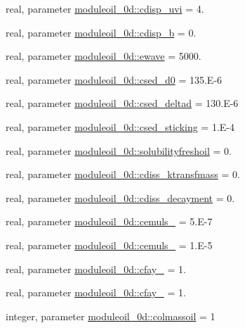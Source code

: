 \begin{DoxyCompactItemize}
\item 
real, parameter \mbox{\hyperlink{namespacemoduleoil__0d_a2ffff41b9d63e745753555b0be9d11be}{moduleoil\+\_\+0d\+::cdisp\+\_\+uvi}} = 4.
\item 
real, parameter \mbox{\hyperlink{namespacemoduleoil__0d_aa093e8de7aa1551ad61da7016758c1cf}{moduleoil\+\_\+0d\+::cdisp\+\_\+b}} = 0.
\item 
real, parameter \mbox{\hyperlink{namespacemoduleoil__0d_a35671174ac62a58afd6e806218d5dada}{moduleoil\+\_\+0d\+::ewave}} = 5000.
\item 
real, parameter \mbox{\hyperlink{namespacemoduleoil__0d_a57eeca412e82f0e98144ff9a97df5c74}{moduleoil\+\_\+0d\+::csed\+\_\+d0}} = 135.\+E-\/6
\item 
real, parameter \mbox{\hyperlink{namespacemoduleoil__0d_a1b21708096f1e93fbd65c07f072fda0f}{moduleoil\+\_\+0d\+::csed\+\_\+deltad}} = 130.\+E-\/6
\item 
real, parameter \mbox{\hyperlink{namespacemoduleoil__0d_aece02e045692a0b555549d5264b8354e}{moduleoil\+\_\+0d\+::csed\+\_\+sticking}} = 1.\+E-\/4
\item 
real, parameter \mbox{\hyperlink{namespacemoduleoil__0d_ab5235c8e862a94b78772c20b7a00d3b3}{moduleoil\+\_\+0d\+::solubilityfreshoil}} = 0.
\item 
real, parameter \mbox{\hyperlink{namespacemoduleoil__0d_a185606fb84723e999c8e1cfca9fe1671}{moduleoil\+\_\+0d\+::cdiss\+\_\+ktransfmass}} = 0.
\item 
real, parameter \mbox{\hyperlink{namespacemoduleoil__0d_a2e86f60430f1b8b8d2154ec1e5ec53d4}{moduleoil\+\_\+0d\+::cdiss\+\_\+decayment}} = 0.
\item 
real, parameter \mbox{\hyperlink{namespacemoduleoil__0d_aac1290068afac9241731a6f2a55925a3}{moduleoil\+\_\+0d\+::cemuls\+\_}} = 5.\+E-\/7
\item 
real, parameter \mbox{\hyperlink{namespacemoduleoil__0d_ab77148bf270daa279217f0d363ff23c8}{moduleoil\+\_\+0d\+::cemuls\+\_}} = 1.\+E-\/5
\item 
real, parameter \mbox{\hyperlink{namespacemoduleoil__0d_af7172aa7a98c670fbebbe27b5bcb77ef}{moduleoil\+\_\+0d\+::cfay\+\_}} = 1.
\item 
real, parameter \mbox{\hyperlink{namespacemoduleoil__0d_a5b328ed2e75a4422dec170f56308b197}{moduleoil\+\_\+0d\+::cfay\+\_}} = 1.
\item 
integer, parameter \mbox{\hyperlink{namespacemoduleoil__0d_af795acf4a49e1f3e4bf2ee9271828e2a}{moduleoil\+\_\+0d\+::colmassoil}} = 1

\end{DoxyCompactItemize}
